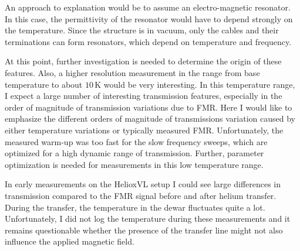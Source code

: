 An approach to explanation would be to assume an electro-magnetic resonator. In this case, the permittivity of the resonator would have to depend strongly on the temperature. Since the structure is in vacuum, only the cables and their terminations can form resonators, which depend on temperature and frequency.

At this point, further investigation is needed to determine the origin of these features. Also, a higher resolution measurement in the range from base temperature to about $10\,$K would be very interesting. In this temperature range, I expect a large number of interesting transmission features, especially in the order of magnitude of transmission variations due to FMR. Here I would like to emphasize the different orders of magnitude of transmissions variation caused by either temperature variations or typically measured FMR. Unfortunately, the measured warm-up was too fast for the slow frequency sweeps, which are optimized for a high dynamic range of transmission. Further, parameter optimization is needed for measurements in this low temperature range.

In early measurements on the HelioxVL setup I could see large differences in transmission compared to the FMR signal before and after helium transfer. During the transfer, the temperature in the dewar fluctuates quite a lot. Unfortunately, I did not log the temperature during these measurements and it remains questionable whether the presence of the transfer line might not also influence the applied magnetic field.